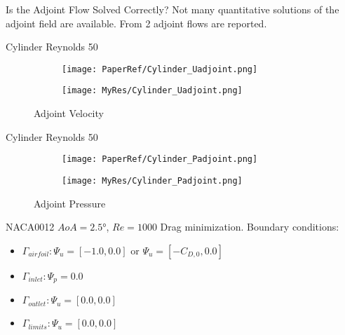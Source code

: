 \begin{frame}{Is the Adjoint Flow Solved Correctly?}
Not many quantitative solutions of the adjoint field are available.
From  2 adjoint flows are reported.    
\end{frame}


\begin{frame}{Cylinder Reynolds 50}
    \begin{figure}[h]
        \centering          
        \begin{subfigure}[h]{0.45\textwidth}
                 \centering
            \texttt{[image: PaperRef/Cylinder\_Uadjoint.png]}
       \end{subfigure}
       \hfill	
       \begin{subfigure}[h]{0.45\textwidth}
                \centering
           \texttt{[image: MyRes/Cylinder\_Uadjoint.png]}
        \end{subfigure}
        \caption{Adjoint Velocity}
        \end{figure} 
    \end{frame}
    
    \begin{frame}{Cylinder Reynolds 50}
    \begin{figure}[h]
        \centering          
        \begin{subfigure}[h]{0.45\textwidth}
                 \centering
            \texttt{[image: PaperRef/Cylinder\_Padjoint.png]}
       \end{subfigure}
       \hfill	
       \begin{subfigure}[h]{0.45\textwidth}
                \centering
           \texttt{[image: MyRes/Cylinder\_Padjoint.png]}
        \end{subfigure}
        \caption{Adjoint Pressure}
        \end{figure} 
    \end{frame}

\begin{frame}{NACA0012 $AoA=\ang{2.5}$, $Re=1000$}
Drag minimization.
Boundary conditions:
\begin{itemize}
    \item $\Gamma_{airfoil}: \Psi_u = [-1.0, 0.0]$ or $ \Psi_u = [-C_{D,0}, 0.0]$
    \item $\Gamma_{inlet}:\Psi_p = 0.0$
    \item $\Gamma_{outlet}: \Psi_u = [0.0, 0.0]$
    \item $\Gamma_{limits}: \Psi_u = [0.0, 0.0]$

\end{itemize}
        
\end{frame}

